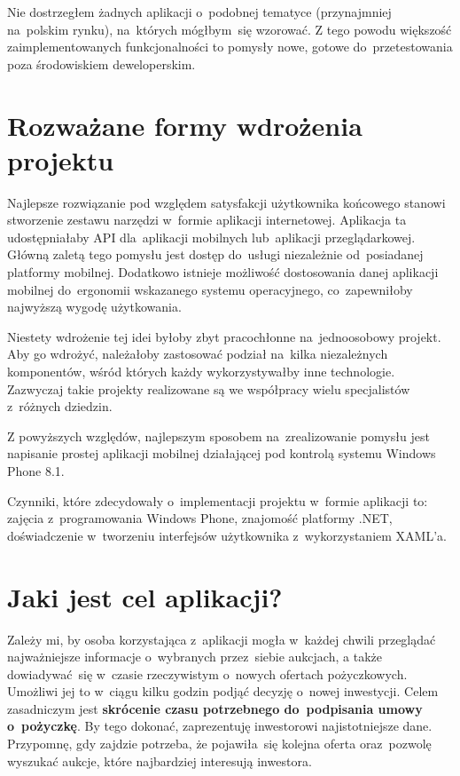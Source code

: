 \documentclass[a4paper,twoside,titlepage,openright]{book}
\begin{document}
Nie dostrzegłem żadnych aplikacji o~podobnej tematyce (przynajmniej na~polskim rynku), na~których mógłbym~się wzorować. Z tego powodu większość zaimplementowanych funkcjonalności to pomysły nowe, gotowe do~przetestowania poza środowiskiem deweloperskim.

\section*{Rozważane formy wdrożenia projektu}

Najlepsze rozwiązanie pod względem satysfakcji użytkownika końcowego stanowi stworzenie zestawu narzędzi w~formie aplikacji internetowej. Aplikacja ta udostępniałaby API dla~aplikacji mobilnych lub~aplikacji przeglądarkowej. Główną zaletą tego pomysłu jest dostęp do~usługi niezależnie od~posiadanej platformy mobilnej. Dodatkowo istnieje możliwość dostosowania danej aplikacji mobilnej do~ergonomii wskazanego systemu operacyjnego, co~zapewniłoby najwyższą wygodę użytkowania. 

Niestety wdrożenie tej idei byłoby zbyt pracochłonne na~jednoosobowy projekt. Aby go wdrożyć, należałoby zastosować podział na~kilka niezależnych komponentów, wśród których każdy wykorzystywałby inne technologie. Zazwyczaj takie projekty realizowane są we współpracy wielu specjalistów z~różnych dziedzin.

Z powyższych względów, najlepszym sposobem na~zrealizowanie pomysłu jest napisanie prostej aplikacji mobilnej działającej pod kontrolą systemu Windows Phone 8.1. 

Czynniki, które zdecydowały o~implementacji projektu w~formie aplikacji to: zajęcia z~programowania Windows Phone, znajomość platformy .NET, doświadczenie w~tworzeniu interfejsów użytkownika z~wykorzystaniem XAML'a.

\section*{Jaki jest cel aplikacji?}

Zależy mi, by osoba korzystająca z~aplikacji mogła w~każdej chwili przeglądać najważniejsze informacje o~wybranych przez~siebie aukcjach, a także dowiadywać~się w~czasie rzeczywistym o~nowych ofertach pożyczkowych. Umożliwi jej to w~ciągu kilku godzin podjąć decyzję o~nowej inwestycji. Celem zasadniczym jest \textbf{skrócenie czasu potrzebnego do~podpisania umowy o~pożyczkę}. By tego dokonać, zaprezentuję inwestorowi najistotniejsze dane. Przypomnę, gdy zajdzie potrzeba, że pojawiła~się kolejna oferta oraz~pozwolę wyszukać aukcje, które najbardziej interesują inwestora.
\end{document}
